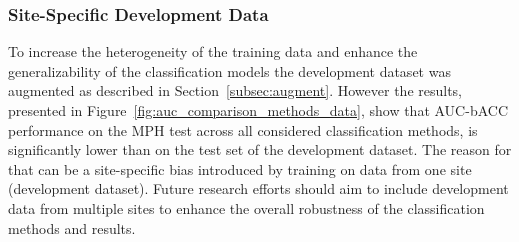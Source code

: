 \subsubsection{Site-Specific Development Data}

To increase the heterogeneity of the training data and enhance the generalizability 
of the classification models the development dataset was augmented as described in Section~\ref{subsec:augment}.
However the results, presented in Figure~\ref{fig:auc_comparison_methods_data}, 
show that AUC-bACC performance on the MPH test across all considered classification methods, 
is significantly lower than on the test set of the development dataset.
The reason for that can be a site-specific bias introduced by training on data from one site (development dataset).
Future research efforts should aim to include development data from multiple sites 
to enhance the overall robustness of the classification methods and results.









